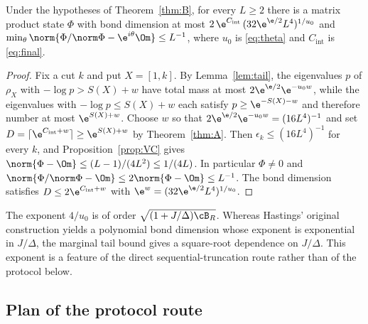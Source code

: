 \begin{theorem}\label{thm:Bshort}
Under the hypotheses of Theorem~\ref{thm:B}, for every $L\ge2$ there is
a matrix product state $\Phi$ with bond dimension at most
$2\,\e^{C_{\mathrm{int}}}\,(32\e^{\e/2}L^4)^{1/u_0}$ and
$\min_\theta\norm{\Phi/\norm\Phi-\e^{i\theta}\Om}\le L^{-1}$, where $u_0$ is
\eqref{eq:theta} and $C_{\mathrm{int}}$ is \eqref{eq:final}.
\end{theorem}
\begin{proof}
Fix a cut $k$ and put $X=[1,k]$. By Lemma~\ref{lem:tail}, the eigenvalues
$p$ of $\rho_X$ with $-\log p>S(X)+w$ have total mass at most
$2\e^{\e/2}\e^{-u_0w}$, while the eigenvalues with $-\log p\le S(X)+w$ each
satisfy $p\ge\e^{-S(X)-w}$ and therefore number at most $\e^{S(X)+w}$.
Choose $w$ so that $2\e^{\e/2}\e^{-u_0w}=(16L^4)^{-1}$ and set
$D=\lceil\e^{C_{\mathrm{int}}+w}\rceil\ge\e^{S(X)+w}$ by Theorem~\ref{thm:A}.
Then $\epsilon_k\le(16L^4)^{-1}$ for every $k$, and Proposition~\ref{prop:VC}
gives $\norm{\Phi-\Om}\le(L-1)/(4L^2)\le1/(4L)$. In particular $\Phi\ne0$
and $\norm{\Phi/\norm\Phi-\Om}\le2\norm{\Phi-\Om}\le L^{-1}$. The bond
dimension satisfies $D\le2\e^{C_{\mathrm{int}}+w}$ with
$\e^{w}=(32\e^{\e/2}L^4)^{1/u_0}$.
\end{proof}

\begin{remark}
The exponent $4/u_0$ is of order $\sqrt{(1+J/\Delta)\cB_R}$. Whereas
Hastings' original construction yields a polynomial bond dimension whose
exponent is exponential in $J/\Delta$, the marginal tail bound gives a
square-root dependence on $J/\Delta$. This exponent is a feature of the
direct sequential-truncation route rather than of the protocol below.
\end{remark}

\subsection*{Plan of the protocol route}

